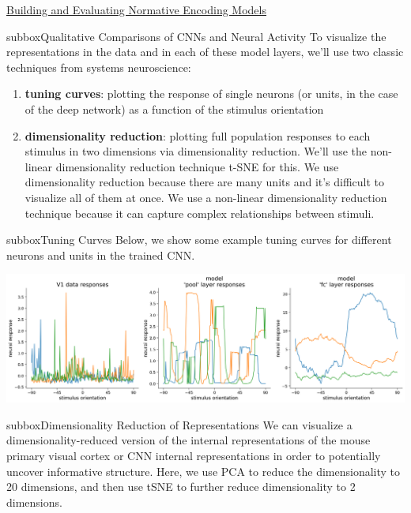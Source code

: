 \begin{textbox}{\href{https://compneuro.neuromatch.io/tutorials/W1D5_DeepLearning/student/W1D5_Tutorial3.html}{Building and Evaluating Normative Encoding Models } }
\begin{subbox}{subbox}{Qualitative Comparisons of CNNs and Neural Activity}
\scriptsize
To visualize the representations in the data and in each of these model layers, we'll use two classic techniques from systems neuroscience:
\begin{enumerate}
    \item 
 \textbf{tuning curves}: plotting the response of single neurons (or units, in the case of the deep network) as a function of the stimulus orientation

    \item  \textbf{dimensionality reduction}: plotting full population responses to each stimulus in two dimensions via dimensionality reduction. We'll use the non-linear dimensionality reduction technique t-SNE for this. We use dimensionality reduction because there are many units and it's difficult to visualize all of them at once. We use a non-linear dimensionality reduction technique because it can capture complex relationships between stimuli.
\end{enumerate}

\end{subbox}
\begin{subbox}{subbox}{Tuning Curves}
\scriptsize
Below, we show some example tuning curves for different neurons and units in the trained CNN.

\centering
\includegraphics[scale=0.15]{Figures/DL/DLFigure6.png}

\end{subbox}
\begin{subbox}{subbox}{Dimensionality Reduction of Representations}
\scriptsize
We can visualize a dimensionality-reduced version of the internal representations of the mouse primary visual cortex or CNN internal representations in order to potentially uncover informative structure. Here, we use PCA to reduce the dimensionality to 20 dimensions, and then use tSNE to further reduce dimensionality to 2 dimensions.


\end{subbox}
\end{textbox}
